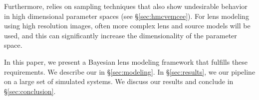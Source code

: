 Furthermore, 
relies on sampling techniques that also show undesirable behavior in high dimensional parameter spaces (see \S\ref{sec:hmcvemcee}).
For lens modeling using high resolution images, often more complex lens and source models
will be used, and this can significantly increase the dimensionality of the parameter space.

In this paper, we present a Bayesian lens modeling framework that fulfills these requirements. 
We describe our  in \S\ref{sec:modeling}.
In \S\ref{sec:results}, we 
 our pipeline on a large set of simulated systems. 
We discuss our results and conclude in \S\ref{sec:conclusion}.



